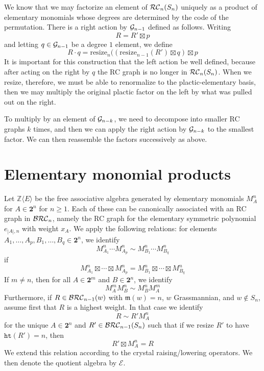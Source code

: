\documentclass{amsart}
\theoremstyle{definition}
\theoremstyle{remark}
\numberwithin{equation}{subsection}
\newcommand{\hr}{\mathtt{ht}}
\newcommand{\maxd}{\mathfrak{m}}
\begin{document}
We know that we may factorize an element of $\mathcal{RC}_n(S_n)$ uniquely as a product of elementary monomials whose degrees are determined by the code of the permutation. There is a right action by $\mathcal{G}_{n-1}$ defined as follows. Writing
$$R = R'\boxtimes p$$
and letting $q\in\mathcal{G}_{n-1}$ be a degree $1$ element, we define
$$R \cdot q = \mathrm{resize}_n((\mathrm{resize}_{n-1}(R')\boxtimes q)\boxtimes p$$
It is important for this construction that the left action be well defined, because after acting on the right by $q$ the RC graph is no longer in $\mathcal{RC}_n(S_n)$. When we resize, therefore, we must be able to renormalize to the plactic-elementary basis, then we may multiply the original plactic factor on the left by what was pulled out on the right.

To multiply by an element of $\mathcal{G}_{n-k}$, we need to decompose into smaller RC graphs $k$ times, and then we can apply the right action by $\mathcal{G}_{n-k}$ to the smallest factor. We can then reassemble the factors successively as above.

\section{Elementary monomial products}

Let $\mathbb{Z}\langle E\rangle$ be the free associative algebra generated by elementary monomials $M_A^n$ for $A\in \mathbf{2}^n$ for $n\geq 1$. Each of these can be canonically associated with an RC graph in $\mathcal{BRC}_n$, namely the RC graph for the elementary symmetric polynomial $e_{|A|,n}$ with weight $x_A$. We apply the following relations: for elements $A_1,\ldots,A_p,B_1,\ldots,B_q\in\mathbf{2}^n$, we identify
$$M_{A_1}^n\cdots M_{A_p}^n\sim M_{B_1}^n\cdots M_{B_q}^n$$
if 
$$M_{A_1}^n\boxtimes\cdots\boxtimes M_{A_p}^n = M_{B_1}^n\boxtimes\cdots\boxtimes M_{B_q}^n$$
If $m\neq n$, then for all $A\in\mathbf{2}^m$ and $B\in \mathbf{2}^n$, we identify
$$M_A^m M_B^n \sim M_B^n M_A^m$$
Furthermore, if $R\in \mathcal{BRC}_{n-1}(w)$ with $\maxd(w)=n$, $w$ Grassmannian, and $w\notin S_n$, assume first that $R$ is a highest weight. In that case we identify
$$R\sim R' M_A^n$$
for the unique $A\in \mathbf{2}^n$ and $R'\in \mathcal{BRC}_{n-1}(S_n)$ such that if we resize $R'$ to have $\hr(R')=n$, then
$$R' \boxtimes M_A^n = R$$
We extend this relation according to the crystal raising/lowering operators. We then denote the quotient algebra by $\mathcal{E}$.
\end{document}
